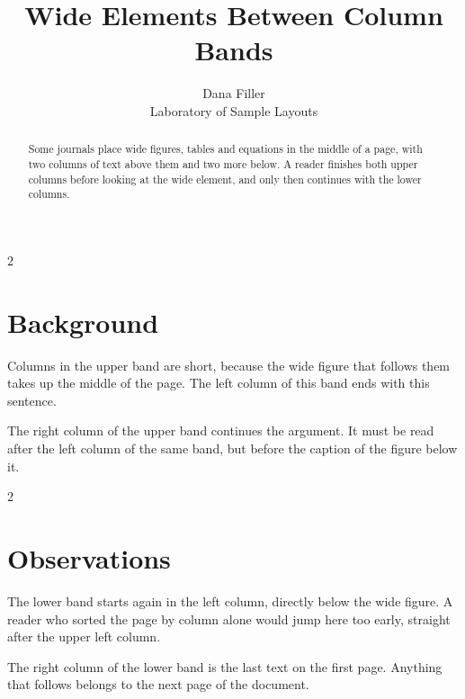 \documentclass[10pt]{article}
\title{Wide Elements Between Column Bands}
\author{Dana Filler\\ Laboratory of Sample Layouts}
\date{}
\begin{document}
\maketitle

\begin{abstract}
Some journals place wide figures, tables and equations in the middle of a
page, with two columns of text above them and two more below. A reader
finishes both upper columns before looking at the wide element, and only
then continues with the lower columns.
\end{abstract}

\begin{multicols}{2}
\section{Background}

Columns in the upper band are short, because the wide figure that follows
them takes up the middle of the page. The left column of this band ends
with this sentence.

\columnbreak

The right column of the upper band continues the argument. It must be read
after the left column of the same band, but before the caption of the
figure below it.
\end{multicols}

\begin{center}
  \label{fig:wide}
\end{center}

\begin{multicols}{2}
\section{Observations}

The lower band starts again in the left column, directly below the wide
figure. A reader who sorted the page by column alone would jump here too
early, straight after the upper left column.

\columnbreak

The right column of the lower band is the last text on the first page.
Anything that follows belongs to the next page of the document.
\end{multicols}
\end{document}
